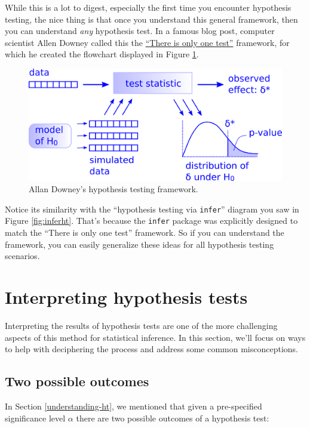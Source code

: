 \documentclass[
]{book}
\begin{document}
While this is a lot to digest, especially the first time you encounter hypothesis testing, the nice thing is that once you understand this general framework, then you can understand \emph{any} hypothesis test. In a famous blog post, computer scientist Allen Downey called this the \href{http://allendowney.blogspot.com/2016/06/there-is-still-only-one-test.html}{``There is only one test''} framework, for which he created the flowchart displayed in Figure \ref{fig:htdowney}.

\begin{figure}
\includegraphics[width=0.9\linewidth]{images/copyright/there_is_only_one_test} \caption{Allan Downey's hypothesis testing framework.}\label{fig:htdowney}
\end{figure}

Notice its similarity with the ``hypothesis testing via \texttt{infer}'' diagram you saw in Figure \ref{fig:inferht}. That's because the \texttt{infer} package was explicitly designed to match the ``There is only one test'' framework. So if you can understand the framework, you can easily generalize these ideas for all hypothesis testing scenarios.

\hypertarget{ht-interpretation}{%
\section{Interpreting hypothesis tests}\label{ht-interpretation}}

Interpreting the results of hypothesis tests are one of the more challenging aspects of this method for statistical inference. In this section, we'll focus on ways to help with deciphering the process and address some common misconceptions.

\hypertarget{trial}{%
\subsection{Two possible outcomes}\label{trial}}

In Section \ref{understanding-ht}, we mentioned that given a pre-specified significance level \(\alpha\) there are two possible outcomes of a hypothesis test:
\end{document}
